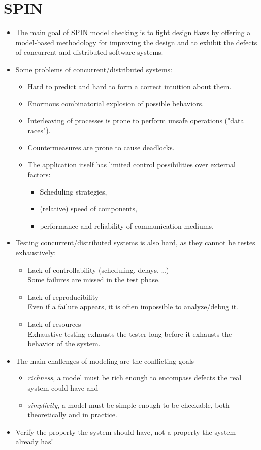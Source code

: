 \documentclass[a4paper, 11pt, accentcolor = tud3b]{tudreport}
\begin{document}
	\chapter{SPIN}
		\label{c:spin}
		
		\begin{itemize}
			\item The main goal of SPIN model checking is to fight design flaws by offering a model-based methodology for improving the design and to exhibit the defects of concurrent and distributed software systems.
			\item Some problems of concurrent/distributed systems:
				\begin{itemize}
					\item Hard to predict and hard to form a correct intuition about them.
					\item Enormous combinatorial explosion of possible behaviors.
					\item Interleaving of processes is prone to perform unsafe operations ("data races").
					\item Countermeasures are prone to cause deadlocks.
					\item The application itself has limited control possibilities over external factors:
						\begin{itemize}
							\item Scheduling strategies,
							\item (relative) speed of components,
							\item performance and reliability of communication mediums.
						\end{itemize}
				\end{itemize}
			\item Testing concurrent/distributed systems is also hard, as they cannot be testes exhaustively:
				\begin{itemize}
					\item Lack of controllability (scheduling, delays, \dots) \\
					Some failures are missed in the test phase.
					\item Lack of reproducibility \\
					Even if a failure appears, it is often impossible to analyze/debug it.
					\item Lack of resources \\
					Exhaustive testing exhausts the tester long before it exhausts the behavior of the system.
				\end{itemize}
			\item The main challenges of modeling are the conflicting goals
				\begin{itemize}
					\item \textit{richness}, a model must be rich enough to encompass defects the real system could have and
					\item \textit{simplicity}, a model must be simple enough to be checkable, both theoretically and in practice.
				\end{itemize}
			\item Verify the property the system should have, not a property the system already has!
		\end{itemize}
	
\end{document}
